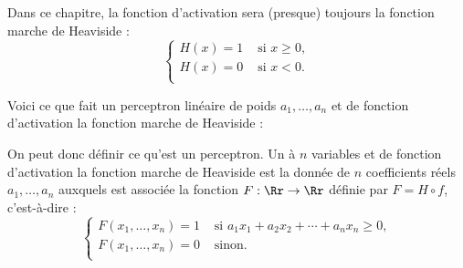 \documentclass[11pt,class=report,crop=false]{standalone}
\begin{document}
Dans ce chapitre, la fonction d'activation sera (presque) toujours la fonction marche de Heaviside :
$$\begin{cases}
H(x) = 1 & \text{ si } x \ge 0, \\
H(x) = 0  & \text{ si } x < 0. \\
\end{cases}$$




Voici ce que fait un perceptron linéaire de poids $a_1,\ldots,a_n$ et de fonction d'activation la fonction marche de Heaviside :



On peut donc définir ce qu'est un perceptron. Un  à $n$ variables et de fonction d'activation la fonction marche de Heaviside est la donnée de $n$ coefficients réels $a_1,\ldots,a_n$ auxquels est associée la fonction $F : \Rr \to \Rr$ définie par $F = H \circ f$, c'est-à-dire :
$$\begin{cases}
F(x_1,\ldots,x_n) = 1 & \text{ si } a_1 x_1 + a_2 x_2 + \cdots + a_n x_n \ge 0, \\
F(x_1,\ldots,x_n) = 0  & \text{ sinon.} \\
\end{cases}$$
\end{document}
